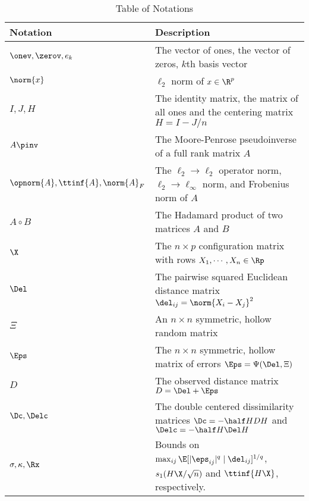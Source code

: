 \documentclass[10pt]{article}
\begin{document}

\begin{table}[h]
    \caption{Table of Notations}
    \label{tab:notation}\smallskip
    \begin{tabularx}{\textwidth}{lX}
        \toprule
        \textbf{Notation} & \textbf{Description} \\
        \midrule
        $\onev, \zerov, e_k$ & The vector of ones, the vector of zeros, $k$th basis vector \\
        $\norm{x}$ & $\ell_2$ norm of $x \in \R^p$ \\
        $I, J, H$ & The identity matrix, the matrix of all ones and the centering matrix $H = I - J/n$ \\
        $A\pinv$ & The Moore-Penrose pseudoinverse of a full rank matrix $A$ \\
        $\opnorm{A}, \ttinf{A}, \norm{A}_F$ & The $\ell_2 \to \ell_2$ operator norm, $\ell_2 \to \ell_\infty$ norm, and Frobenius norm of $A$\\
        $A \circ B$ & The Hadamard product of two matrices $A$ and $B$ \\
        $\X$ & The $n \times p$ configuration matrix with rows $X_1, \cdots, X_n \in \Rp$ \\
        $\Del$ & The pairwise squared Euclidean distance matrix $\del_{ij} = \norm{X_i - X_j}^2$ \\
        $\Xi$ & An $n \times n$ symmetric, hollow random matrix \\
        $\Eps$ & The $n \times n$ symmetric, hollow matrix of errors $\Eps = \Psi(\Del, \Xi)$ \\
        $D$ & The observed distance matrix $D = \Del + \Eps$ \\
        $\Dc, \Delc$ & The double centered dissimilarity matrices $\Dc = -\half HDH$ and $\Delc = -\half H\Del H$ \\
        $\sigma, \kappa, \Rx$ & Bounds on $\max_{ij}\E[|\eps_{ij}|^q \mid \del_{ij}]^{1/q}$, $s_1(H\X/\sqrt{n})$ and $\ttinf{H\X}$, respectively. \\
        \bottomrule
    \end{tabularx}
\end{table}

\end{document}
